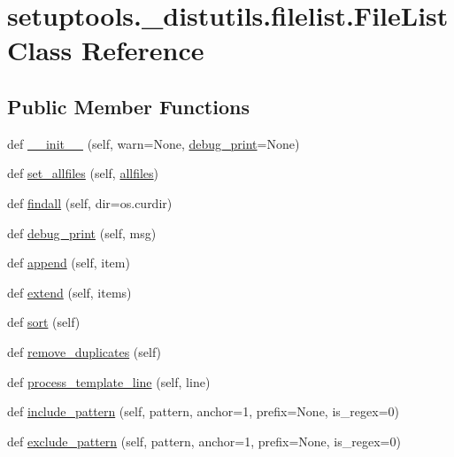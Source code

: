 \hypertarget{classsetuptools_1_1__distutils_1_1filelist_1_1FileList}{}\section{setuptools.\+\_\+distutils.\+filelist.\+File\+List Class Reference}
\label{classsetuptools_1_1__distutils_1_1filelist_1_1FileList}
\subsection*{Public Member Functions}
\begin{DoxyCompactItemize}
\item 
def \hyperlink{classsetuptools_1_1__distutils_1_1filelist_1_1FileList_a0c88f59650d62464970a15a6ef558594}{\+\_\+\+\_\+init\+\_\+\+\_\+} (self, warn=None, \hyperlink{classsetuptools_1_1__distutils_1_1filelist_1_1FileList_a103c77716abc8d6da34630a969d4c233}{debug\+\_\+print}=None)
\item 
def \hyperlink{classsetuptools_1_1__distutils_1_1filelist_1_1FileList_a0d0864c8fa5b5e82f554a639bfa6ab02}{set\+\_\+allfiles} (self, \hyperlink{classsetuptools_1_1__distutils_1_1filelist_1_1FileList_a1819dd24956f65d94ba94baea3f548c4}{allfiles})
\item 
def \hyperlink{classsetuptools_1_1__distutils_1_1filelist_1_1FileList_ae50770e059c38abacfd2d4844f5cf3da}{findall} (self, dir=os.\+curdir)
\item 
def \hyperlink{classsetuptools_1_1__distutils_1_1filelist_1_1FileList_a103c77716abc8d6da34630a969d4c233}{debug\+\_\+print} (self, msg)
\item 
def \hyperlink{classsetuptools_1_1__distutils_1_1filelist_1_1FileList_ad959a965cf3f8da9546d718ce7a15d9d}{append} (self, item)
\item 
def \hyperlink{classsetuptools_1_1__distutils_1_1filelist_1_1FileList_a857522eaf9de6edd66fc3937bf0af493}{extend} (self, items)
\item 
def \hyperlink{classsetuptools_1_1__distutils_1_1filelist_1_1FileList_a8adcd030f9caf347455b26063b2aebf5}{sort} (self)
\item 
def \hyperlink{classsetuptools_1_1__distutils_1_1filelist_1_1FileList_a834d31a5a36d8a9db6b760c4c0735e97}{remove\+\_\+duplicates} (self)
\item 
def \hyperlink{classsetuptools_1_1__distutils_1_1filelist_1_1FileList_a9aa34753e0a1f54ab3e31035c1f9afa9}{process\+\_\+template\+\_\+line} (self, line)
\item 
def \hyperlink{classsetuptools_1_1__distutils_1_1filelist_1_1FileList_a91dd74782ce2e90e381652cc4b51cf7a}{include\+\_\+pattern} (self, pattern, anchor=1, prefix=None, is\+\_\+regex=0)
\item 
def \hyperlink{classsetuptools_1_1__distutils_1_1filelist_1_1FileList_a87ae6b570df4626843c43720164b87d2}{exclude\+\_\+pattern} (self, pattern, anchor=1, prefix=None, is\+\_\+regex=0)
\end{DoxyCompactItemize}
